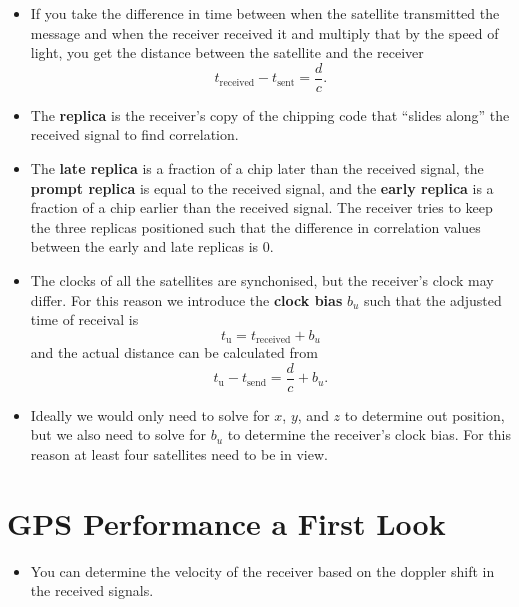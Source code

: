 \documentclass{article}
\begin{document}
\begin{itemize}
  \item If you take the difference in time between when the satellite transmitted the message and when the receiver received it and multiply that by the speed of light, you get the distance between the satellite and the receiver \[t_\text{received} - t_\text{sent} = \frac{d}{c}.\]

  \item The \textbf{replica} is the receiver's copy of the chipping code that ``slides along'' the received signal to find correlation.

  \item The \textbf{late replica} is a fraction of a chip later than the received signal, the \textbf{prompt replica} is equal to the received signal, and the \textbf{early replica} is a fraction of a chip earlier than the received signal. The receiver tries to keep the three replicas positioned such that the difference in correlation values between the early and late replicas is $0$.

  \item The clocks of all the satellites are synchonised, but the receiver's clock may differ. For this reason we introduce the \textbf{clock bias} $b_u$ such that the adjusted time of receival is \[t_\text{u} = t_\text{received} + b_u\] and the actual distance can be calculated from \[t_\text{u} - t_\text{send} = \frac{d}{c} + b_u.\]

  \item Ideally we would only need to solve for $x$, $y$, and $z$ to determine out position, but we also need to solve for $b_u$ to determine the receiver's clock bias. For this reason at least four satellites need to be in view.
\end{itemize}

\section{GPS Performance a First Look}

\begin{itemize}
  \item You can determine the velocity of the receiver based on the doppler shift in the received signals.
\end{itemize}
\end{document}

